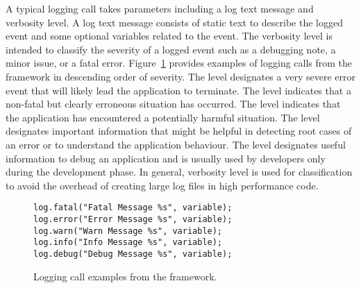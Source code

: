 A typical logging call takes parameters including a log text message and verbosity level. A log text message consists of static text to describe the logged event and some optional variables related to the event. The verbosity level is intended to classify the severity of a logged event such as a debugging note, a minor issue, or a fatal error. Figure~\ref{fig:log-call-examples} provides examples of logging calls from the  framework in descending order of severity. The  level designates a very severe error event that will likely lead the application to terminate. The  level indicates that a non-fatal but clearly erroneous situation has occurred. The  level indicates that the application has encountered a potentially harmful situation. The  level designates important information that might be helpful in detecting root cases of an error or to understand the application behaviour. The  level designates useful information to debug an application and is usually used by developers only during the development phase. In general, verbosity level is used for classification to avoid the overhead of creating large log files in high performance code.


\begin{figure}[H]
\vspace*{1em}
\begin{center}
\begin{minipage}{4in}
\begin{lstlisting}[frame=single,numbers=none]
log.fatal("Fatal Message %s", variable);
log.error("Error Message %s", variable);
log.warn("Warn Message %s", variable);
log.info("Info Message %s", variable);
log.debug("Debug Message %s", variable);
\end{lstlisting}
\end{minipage}
\caption{Logging call examples from the  framework.\label{fig:chap1_logCode}\label{fig:log-call-examples}}
\end{center}
\end{figure}

